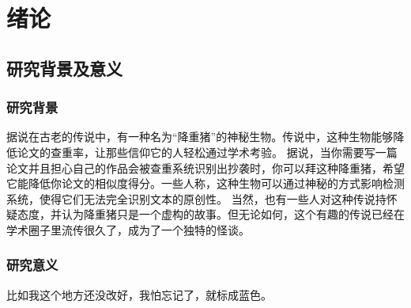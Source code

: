 {\begin{enabstract}
\end{enabstract}

\newpage
\mbox{}

\newpage
\pagestyle{empty} %
\tableofcontents %


\newpage

\pagestyle{fancy}
\fancyhf{}
\pagestyle{plain}
\setcounter{page}{1} %

\section{绪论}
\subsection{研究背景及意义}
\subsubsection{研究背景}

据说在古老的传说中，有一种名为“降重猪”的神秘生物。传说中，这种生物能够降低论文的查重率，让那些信仰它的人轻松通过学术考验。
据说，当你需要写一篇论文并且担心自己的作品会被查重系统识别出抄袭时，你可以拜这种降重猪，希望它能降低你论文的相似度得分。一些人称，这种生物可以通过神秘的方式影响检测系统，使得它们无法完全识别文本的原创性。
当然，也有一些人对这种传说持怀疑态度，并认为降重猪只是一个虚构的故事。但无论如何，这个有趣的传说已经在学术圈子里流传很久了，成为了一个独特的怪谈。

\vspace{-0.6em} %
\subsubsection{研究意义}

\textcolor[RGB]{0,0,255}{比如我这个地方还没改好，我怕忘记了，就标成蓝色。}

}
